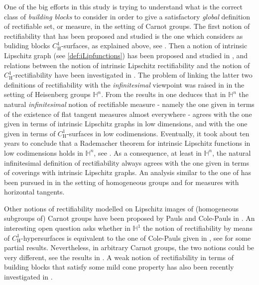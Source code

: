 \documentclass[10pt, a4paper,
oneside, headinclude,footinclude]{scrartcl}
\begin{document}
One of the big efforts in this study is trying to understand what is the correct class of \textit{building blocks} to consider in order to give a satisfactory \textit{global} definition of rectifiable set, or measure, in the setting of Carnot groups. The first notion of rectifiability that has been proposed and studied is the one which considers as buliding blocks $C^1_{\mathrm H}$-surfaces, as explained above, see \cite{step2, FSSC03b, FSSC07, MagnaniTwoardsDiff, JNGV20}. Then a notion of intrinsic Lipschitz graph (see \cref{def:iLipfunctions}) has been proposed and studied in \cite{FSSC06, FranchiSerapioni16}, and relations between the notion of intrinsic Lipschitz rectifiability and the notion of $C^1_{\mathrm H}$-rectifiability have been investigated in \cite{FSSC11, FMS14}. The problem of linking the latter two definitions of rectifiability with the \textit{infinitesimal} viewpoint was raised in \cite{MatSerSC} in the setting of Heisenberg groups $\mathbb H^n$. From the results in \cite{MatSerSC} one deduces that in $\mathbb H^n$ the natural \textit{infinitesimal} notion of rectifiable measure - namely the one given in terms of the existence of flat tangent measures almost everywhere - agrees with the one given in terms of intrinsic Lipschitz graphs in low dimensions, and with the one given in terms of $C^1_{\mathrm H}$-surfaces in low codimensions. Eventually, it took about ten years to conclude that a Rademacher theorem for intrinsic Lipschitz functions in low codimensions holds in $\mathbb H^n$, see \cite{Vittone20}. As a consequence, at least in $\mathbb H^n$, the natural infinitesimal definition of rectifiability always agrees with the one given in terms of coverings with intrinsic Lipschitz graphs. 
An analysis similar to the one of \cite{MatSerSC} has been pursued in \cite{IMM20} in the setting of homogeneous groups and for measures with horizontal tangents. 

Other notions of rectifiability modelled on Lipschitz images of (homogeneous subgroups of) Carnot groups have been proposed by Pauls and Cole-Pauls in \cite{Pauls04, CP06}. An interesting open question asks whether in $\mathbb H^1$ the notion of rectifiability by means of $C^1_{\mathrm H}$-hypersurfaces is equivalent to the one of Cole-Pauls given in \cite{CP06}, see \cite{BigolinVittone10,DDFO20} for some partial results. Nevertheless, in arbitrary Carnot groups, the two notions could be very different, see the results in \cite{ALD}. A weak notion of rectifiability in terms of building blocks that satisfy some mild cone property has also been recently investigated in \cite{DLDMV19}.
\end{document}
